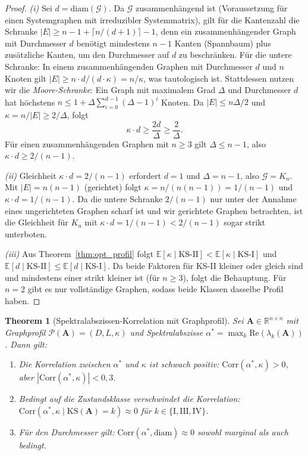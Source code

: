 ﻿\documentclass[12pt, a4paper, titlepage]{report}
\newtheorem{theorem}{Theorem}[section]
\theoremstyle{definition}
\theoremstyle{remark}
\newcommand{\R}{\mathbb{R}}
\newcommand{\vA}{\bm{A}}
\newcommand{\re}{\mathrm{Re}}
\newcommand{\KS}{\mathrm{KS}}
\begin{document}
\begin{proof}
\textit{(i)} Sei $d = \mathrm{diam}(\mathcal{G})$. Da $\mathcal{G}$ zusammenhängend
ist (Voraussetzung für einen Systemgraphen mit irreduzibler Systemmatrix), gilt für
die Kantenzahl die Schranke $|E| \geq n - 1 + \lceil n/(d+1) \rceil - 1$, denn
ein zusammenhängender Graph mit Durchmesser $d$ benötigt mindestens $n-1$ Kanten
(Spannbaum) plus zusätzliche Kanten, um den Durchmesser auf $d$ zu beschränken.
Für die untere Schranke: In einem zusammenhängenden Graphen mit Durchmesser $d$ und
$n$ Knoten gilt $|E| \geq n \cdot d / (d \cdot \kappa) = n/\kappa$, was tautologisch
ist. Stattdessen nutzen wir die \emph{Moore-Schranke}: Ein Graph mit maximalem Grad
$\Delta$ und Durchmesser $d$ hat höchstens $n \leq 1 + \Delta \sum_{i=0}^{d-1}
(\Delta - 1)^i$ Knoten. Da $|E| \leq n\Delta / 2$ und $\kappa = n/|E| \geq 2/\Delta$,
folgt
\[
  \kappa \cdot d \geq \frac{2d}{\Delta} \geq \frac{2}{\Delta}.
\]
Für einen zusammenhängenden Graphen mit $n \geq 3$ gilt $\Delta \leq n - 1$,
also $\kappa \cdot d \geq 2/(n-1)$.

\textit{(ii)} Gleichheit $\kappa \cdot d = 2/(n-1)$ erfordert $d = 1$ und
$\Delta = n-1$, also $\mathcal{G} = K_n$. Mit $|E| = n(n-1)$ (gerichtet) folgt
$\kappa = n/(n(n-1)) = 1/(n-1)$ und $\kappa \cdot d = 1/(n-1)$.
Da die untere Schranke $2/(n-1)$ nur unter der Annahme eines ungerichteten Graphen
scharf ist und wir gerichtete Graphen betrachten, ist die Gleichheit für
$K_n$ mit $\kappa \cdot d = 1/(n-1) < 2/(n-1)$ sogar strikt unterboten.

\textit{(iii)} Aus Theorem~\ref{thm:opt_profil} folgt $\mathbb{E}[\kappa \mid
\KS\text{-II}] < \mathbb{E}[\kappa \mid \KS\text{-I}]$ und
$\mathbb{E}[d \mid \KS\text{-II}] \leq \mathbb{E}[d \mid \KS\text{-I}]$.
Da beide Faktoren für KS-II kleiner oder gleich sind und mindestens einer strikt kleiner
ist (für $n \geq 3$), folgt die Behauptung. Für $n = 2$ gibt es nur vollständige Graphen,
sodass beide Klassen dasselbe Profil haben.
\end{proof}

\begin{theorem}[Spektralabszissen-Korrelation mit Graphprofil]
\label{thm:spektral_kappa}
Sei $\vA \in \R^{n \times n}$ mit Graphprofil $\mathcal{P}(\vA) = (D, L, \kappa)$
und Spektralabszisse $\alpha^* = \max_k \re(\lambda_k(\vA))$. Dann gilt:
\begin{enumerate}[label=(\roman*)]
  \item Die Korrelation zwischen $\alpha^*$ und $\kappa$ ist schwach positiv:
    $\mathrm{Corr}(\alpha^*, \kappa) > 0$, aber $|\mathrm{Corr}(\alpha^*, \kappa)| < 0{,}3$.
  \item Bedingt auf die Zustandsklasse verschwindet die Korrelation:
    $\mathrm{Corr}(\alpha^*, \kappa \mid \KS(\vA) = k) \approx 0$ für $k \in \{\mathrm{I},
    \mathrm{III}, \mathrm{IV}\}$.
  \item Für den Durchmesser gilt:
    $\mathrm{Corr}(\alpha^*, \mathrm{diam}) \approx 0$ sowohl marginal als auch bedingt.
\end{enumerate}
\end{theorem}
\end{document}
